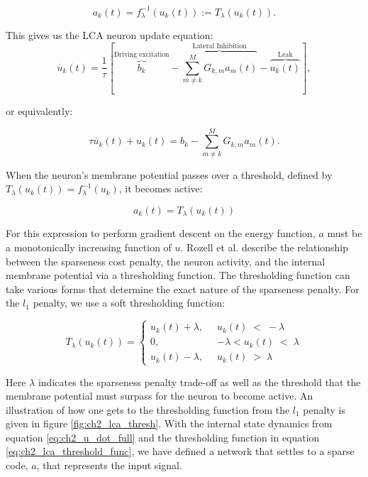 \begin{displaymath}\label{eq:ch2_a_thresh}
    a_{k}(t) = f_{\lambda}^{-1}(u_{k}(t)) := T_{\lambda}(u_{k}(t)).
\end{displaymath}

This gives us the LCA neuron update equation:
\begin{equation}\label{eq:ch2_u_dot_full}
    \dot{u_{k}}(t) = \frac{1}{\tau} \left[\overbrace{b_{k}}^\text{Driving excitation} - \overbrace{\sum_{m \neq k}^{M}G_{k,m}a_{m}(t)}^\text{Lateral Inhibition} - \overbrace{u_{k}(t)}^\text{Leak} \right],
\end{equation}

\noindent or equivalently:

\begin{displaymath}
    \tau \dot{u_{k}}(t) + u_{k}(t) =  b_{k} - \sum_{m \neq k}^{M}G_{k,m}a_{m}(t).
\end{displaymath}

When the neuron's membrane potential passes over a threshold, defined by $T_{\lambda}(u_{k}(t)) = f_{\lambda}^{-1}(u_{k})$, it becomes active:

\begin{equation}\label{eq:ch2_a_thresh}
  a_{k}(t) = T_{\lambda}(u_{k}(t))
\end{equation}

For this expression to perform gradient descent on the energy function, $a$ must be a monotonically increasing function of $u$. Rozell et al. \citeyearpar{rozell2008sparse} describe the relationship between the sparseness cost penalty, the neuron activity, and the internal membrane potential via a thresholding function. The thresholding function can take various forms that determine the exact nature of the sparseness penalty. For the $l_{1}$ penalty, we use a soft thresholding function:

\begin{equation}\label{eq:ch2_lca_threshold_func}
    T_{\lambda}(u_{k}(t)) = \left\{
    \begin{aligned}
        u_{k}(t)+\lambda,\;\; &u_{k}(t)\; <\; -\lambda \\
        0,\;\; &-\lambda < u_{k}(t)\; <\; \lambda \\
        u_{k}(t)-\lambda,\;\; &u_{k}(t)\; >\; \lambda
    \end{aligned}
    \right.
\end{equation}

Here $\lambda$ indicates the sparseness penalty trade-off as well as the threshold that the membrane potential must surpass for the neuron to become active. An illustration of how one gets to the thresholding function from the $l_{1}$ penalty is given in figure \ref{fig:ch2_lca_thresh}. With the internal state dynamics from equation \eqref{eq:ch2_u_dot_full} and the thresholding function in equation \eqref{eq:ch2_lca_threshold_func}, we have defined a network that settles to a sparse code, $a$, that represents the input signal.

